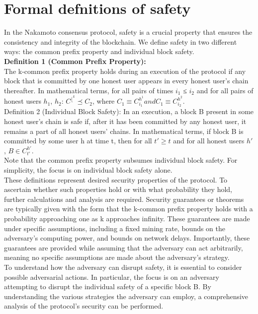 \documentclass{report}
\begin{document}
\section{Formal defnitions of safety}
In the Nakamoto consensus protocol, safety is a crucial property that ensures the consistency and integrity of the blockchain. We define safety in two different ways: the common prefix property and individual block safety.\\
\textbf{Definition 1 (Common Prefix Property):}\\
The k-common prefix property holds during an execution of the protocol if any block that is committed by one honest user appears in every honest user's chain thereafter. In mathematical terms, for all pairs of times $i_{1}$ ≤ $i_{2}$ and for all pairs of honest users $h_{1}$, $h_{2}$:
$C^{⌊^{k}} ⪯ C_{2}$,
where $C_{1} ≡ C_{i_{1}}^{h^{1}} and C_{1} ≡ C_{i_{2}}^{h^{2}}.$\\
Definition 2 (Individual Block Safety):
In an execution, a block B present in some honest user's chain is safe if, after it has been committed by any honest user, it remains a part of all honest users' chains. In mathematical terms, if block B is committed by some user h at time t, then for all $t′ ≥ t$ and for all honest users $h′$, $B ∈ C_{t'}^{h′}$.\\
Note that the common prefix property subsumes individual block safety. For simplicity, the focus is on individual block safety alone.\\
These definitions represent desired security properties of the protocol. To ascertain whether such properties hold or with what probability they hold, further calculations and analysis are required. Security guarantees or theorems are typically given with the form that the k-common prefix property holds with a probability approaching one as k approaches infinity. These guarantees are made under specific assumptions, including a fixed mining rate, bounds on the adversary's computing power, and bounds on network delays. Importantly, these guarantees are provided while assuming that the adversary can act arbitrarily, meaning no specific assumptions are made about the adversary's strategy.\\
To understand how the adversary can disrupt safety, it is essential to consider possible adversarial actions. In particular, the focus is on an adversary attempting to disrupt the individual safety of a specific block B. By understanding the various strategies the adversary can employ, a comprehensive analysis of the protocol's security can be performed.
\end{document}
